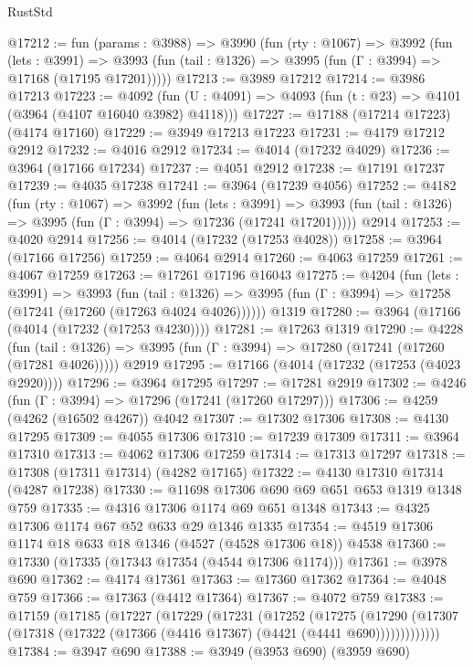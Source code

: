 \begin{lexlean}{RustStd}
\begin{coremodule}
@17212 := fun (params : @3988) =>
  @3990
    (fun (rty : @1067) =>
    @3992
      (fun (lets : @3991) =>
      @3993 (fun (tail : @1326) => @3995 (fun (Γ : @3994) => @17168 (@17195 @17201)))))
@17213 := @3989 @17212
@17214 := @3986 @17213
@17223 := @4092
    (fun (U : @4091) => @4093 (fun (t : @23) => @4101 (@3964 (@4107 @16040 @3982) @4118)))
@17227 := @17188 (@17214 @17223) (@4174 @17160)
@17229 := @3949 @17213 @17223
@17231 := @4179 @17212 @2912
@17232 := @4016 @2912
@17234 := @4014 (@17232 @4029)
@17236 := @3964 (@17166 @17234)
@17237 := @4051 @2912
@17238 := @17191 @17237
@17239 := @4035 @17238
@17241 := @3964 (@17239 @4056)
@17252 := @4182
    (fun (rty : @1067) =>
    @3992
      (fun (lets : @3991) =>
      @3993 (fun (tail : @1326) => @3995 (fun (Γ : @3994) => @17236 (@17241 @17201)))))
    @2914
@17253 := @4020 @2914
@17256 := @4014 (@17232 (@17253 @4028))
@17258 := @3964 (@17166 @17256)
@17259 := @4064 @2914
@17260 := @4063 @17259
@17261 := @4067 @17259
@17263 := @17261 @17196 @16043
@17275 := @4204
    (fun (lets : @3991) =>
    @3993
      (fun (tail : @1326) =>
      @3995 (fun (Γ : @3994) => @17258 (@17241 (@17260 (@17263 @4024 @4026))))))
    @1319
@17280 := @3964 (@17166 (@4014 (@17232 (@17253 @4230))))
@17281 := @17263 @1319
@17290 := @4228
    (fun (tail : @1326) => @3995 (fun (Γ : @3994) => @17280 (@17241 (@17260 (@17281 @4026)))))
    @2919
@17295 := @17166 (@4014 (@17232 (@17253 (@4023 @2920))))
@17296 := @3964 @17295
@17297 := @17281 @2919
@17302 := @4246 (fun (Γ : @3994) => @17296 (@17241 (@17260 @17297)))
@17306 := @4259 (@4262 (@16502 @4267)) @4042
@17307 := @17302 @17306
@17308 := @4130 @17295
@17309 := @4055 @17306
@17310 := @17239 @17309
@17311 := @3964 @17310
@17313 := @4062 @17306 @17259
@17314 := @17313 @17297
@17318 := @17308 (@17311 @17314) (@4282 @17165)
@17322 := @4130 @17310 @17314 (@4287 @17238)
@17330 := @11698 @17306 @690 @69 @651 @653 @1319 @1348 @759
@17335 := @4316 @17306 @1174 @69 @651 @1348
@17343 := @4325 @17306 @1174 @67 @52 @633 @29 @1346 @1335
@17354 := @4519 @17306 @1174 @18 @633 @18 @1346 (@4527 (@4528 @17306 @18)) @4538
@17360 := @17330 (@17335 (@17343 @17354 (@4544 @17306 @1174)))
@17361 := @3978 @690
@17362 := @4174 @17361
@17363 := @17360 @17362
@17364 := @4048 @759
@17366 := @17363 (@4412 @17364)
@17367 := @4072 @759
@17383 := @17159
    (@17185
      (@17227
        (@17229
          (@17231
            (@17252
              (@17275
                (@17290
                  (@17307 (@17318 (@17322 (@17366 (@4416 @17367) (@4421 (@4441 @690)))))))))))))
@17384 := @3947 @690
@17388 := @3949 (@3953 @690) (@3959 @690)

\end{coremodule}
\end{lexlean}
